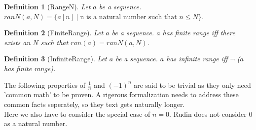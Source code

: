 \documentclass{article}
\newenvironment{forthel}{\begin{leftbar}}{\end{leftbar}}
\newtheorem{definition}{Definition}
\begin{document}
\begin{forthel}
	\begin{definition}[RangeN] Let $a$ be a sequence. \\ $ranN(a,N) = \{a[n] \mid \text{n is a natural number such that } n \leq N\}$. 
	\end{definition}
	
	\begin{definition}[FiniteRange]	Let $a$ be a sequence. $a$ has finite range iff there exists an $N$ such that $ran(a) = ranN(a,N)$.
	\end{definition}

	\begin{definition}[InfiniteRange] Let $a$ be a sequence. $a$ has infinite range iff $\neg$ ($a$ has finite range).
	\end{definition}
\end{forthel}

\noindent The following properties of $\frac{1}{n}$ and $(-1)^{n}$ are said to be trivial as they only need 'common math' to be proven. A rigerous formalization needs to address these common facts seperately, so they text gets naturally longer.\\

\noindent Here we also have to consider the special case of $n=0$. Rudin does not consider 0 as a natural number.
\end{document}
